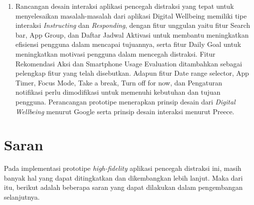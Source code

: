 \begin{enumerate}
  \item Rancangan desain interaksi aplikasi pencegah distraksi yang tepat untuk menyelesaikan masalah-masalah dari aplikasi Digital Wellbeing memiliki tipe interaksi \textit{Instructing} dan \textit{Responding}, dengan fitur unggulan yaitu fitur Search bar, App Group, dan Daftar Jadwal Aktivasi untuk membantu meningkatkan efisiensi pengguna dalam mencapai tujuannya, serta fitur Daily Goal untuk meningkatkan motivasi pengguna dalam mencegah distraksi. Fitur Rekomendasi Aksi dan Smartphone Usage Evaluation ditambahkan sebagai pelengkap fitur yang telah disebutkan. Adapun fitur Date range selector, App Timer, Focus Mode, Take a break, Turn off for now, dan Pengaturan notifikasi perlu dimodifikasi untuk memenuhi kebutuhan dan tujuan pengguna. Perancangan prototipe menerapkan prinsip desain dari \textit{Digital Wellbeing} menurut Google serta prinsip desain interaksi menurut Preece.  
   
\end{enumerate}

\section{Saran}
Pada implementasi prototipe \textit{high-fidelity} aplikasi pencegah distraksi ini, masih banyak hal yang dapat ditingkatkan dan dikembangkan lebih lanjut. Maka dari itu, berikut adalah beberapa saran yang dapat dilakukan dalam pengembangan selanjutnya.

